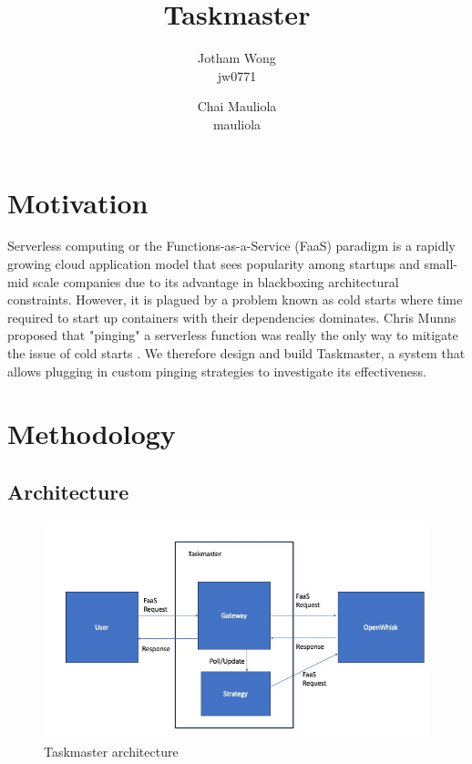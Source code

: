 \documentclass{article}
\title{Taskmaster}
\author{
    Jotham Wong\\
    jw0771\\
    \and
    Chai Mauliola\\
    mauliola
}
\begin{document}
\maketitle

\section{Motivation}

Serverless computing or the Functions-as-a-Service (FaaS) paradigm is a rapidly growing cloud application model that sees popularity among startups and small-mid scale companies due to its advantage in blackboxing architectural constraints. However, it is plagued by a problem known as cold starts where time required to start up containers with their dependencies dominates. Chris Munns proposed that "pinging" a serverless function was really the only way to mitigate the issue of cold starts \cite{jeremydaly}. We therefore design and build Taskmaster, a system that allows plugging in custom pinging strategies to investigate its effectiveness.

\section{Methodology}

\subsection{Architecture}

\begin{figure}
    \begin{center}
        \includegraphics[width=\textwidth]{architecture.jpg}
    \end{center}
    \label{fig:taskmaster}
    \caption{Taskmaster architecture}
\end{figure}
\end{document}
